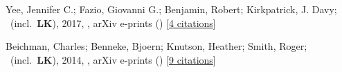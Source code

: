 \item[{\color{numcolor}\scriptsize2}] Yee, Jennifer C.; Fazio, Giovanni G.; Benjamin, Robert; Kirkpatrick, J. Davy; \etal\ (incl.\ \textbf{LK}), 2017, , arXiv e-prints () [\href{https://ui.adsabs.harvard.edu/abs/2017arXiv171004194Y}{4 citations}]

\item[{\color{numcolor}\scriptsize1}] Beichman, Charles; Benneke, Bjoern; Knutson, Heather; Smith, Roger; \etal\ (incl.\ \textbf{LK}), 2014, , arXiv e-prints () [\href{https://ui.adsabs.harvard.edu/abs/2014arXiv1411.1754B}{9 citations}]
